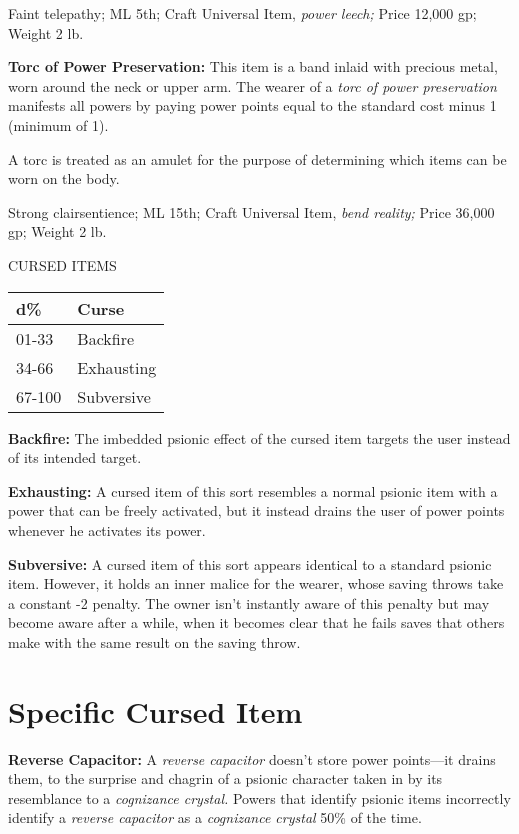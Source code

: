 \documentclass{article}
\begin{document}
Faint telepathy; ML 5th; Craft Universal Item, \textit{power leech; }Price 12,000 
gp; Weight 2 lb.

\textbf{Torc of Power Preservation:} This item is a band inlaid with precious metal, 
worn around the neck or upper arm. The wearer of a \textit{torc of power preservation 
}manifests all powers by paying power points equal to the standard cost minus 1 
(minimum of 1).

A torc is treated as an amulet for the purpose of determining which items can be 
worn on the body.

Strong clairsentience; ML 15th; Craft Universal Item, \textit{bend reality; }Price 
36,000 gp; Weight 2 lb.

\vspace{12pt}
CURSED ITEMS

\begin{tabular}{|>{\raggedright}p{28pt}|>{\raggedright}p{43pt}|}
\hline
d\textbf{\%} & C\textbf{urse}\tabularnewline
\hline
01-33 & Backfire\tabularnewline
\hline
34-66 & Exhausting\tabularnewline
\hline
67-100 & Subversive\tabularnewline
\hline
\end{tabular}

\textbf{Backfire:} The imbedded psionic effect of the cursed item targets the user 
instead of its intended target.

\textbf{Exhausting:} A cursed item of this sort resembles a normal psionic item 
with a power that can be freely activated, but it instead drains the user of power 
points whenever he activates its power. 

\textbf{Subversive: }A cursed item of this sort appears identical to a standard 
psionic item. However, it holds an inner malice for the wearer, whose saving throws 
take a constant -2 penalty. The owner isn't instantly aware of this penalty but 
may become aware after a while, when it becomes clear that he fails saves that 
others make with the same result on the saving throw.

\vspace{12pt}
\section*{\textbf{Specific Cursed Item}}

\textbf{Reverse Capacitor:} A \textit{reverse capacitor }doesn't store power points---it 
drains them, to the surprise and chagrin of a psionic character taken in by its 
resemblance to a \textit{cognizance crystal. }Powers that identify psionic items 
incorrectly identify a \textit{reverse capacitor }as a \textit{cognizance crystal 
}50\% of the time.
\end{document}
